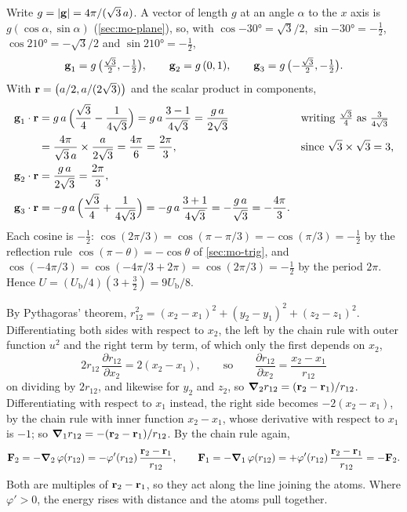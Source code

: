 Write $g = \lvert\bm{\mathrm{g}}\rvert = 4\pi/(\sqrt3\,a)$.
A vector of length $g$ at an angle $\alpha$ to the $x$ axis is $g(\cos
\alpha, \sin\alpha)$ (\cref{sec:mo-plane}), so, with $\cos\ang{-30} =
\sqrt3/2$, $\sin\ang{-30} = -\frac12$, $\cos\ang{210} = -\sqrt3/2$ and
$\sin\ang{210} = -\frac12$,
\begin{equation*}
   \bm{\mathrm{g}}_1 = g\,\bigl(\tfrac{\sqrt3}{2}, -\tfrac12\bigr) , \qquad
   \bm{\mathrm{g}}_2 = g\,(0, 1) , \qquad
   \bm{\mathrm{g}}_3 = g\,\bigl(-\tfrac{\sqrt3}{2}, -\tfrac12\bigr) .
\end{equation*}
With $\bm{\mathrm{r}} = \bigl(a/2, a/(2\sqrt3)\bigr)$ and the scalar product in
components,
\begin{align*}
   \bm{\mathrm{g}}_1\cdot\bm{\mathrm{r}}
   &= g\,a\,\Bigl(\frac{\sqrt3}{4} - \frac{1}{4\sqrt3}\Bigr)
   = g\,a\,\frac{3 - 1}{4\sqrt3} = \frac{g\,a}{2\sqrt3}
      && \text{writing $\tfrac{\sqrt3}{4}$ as $\tfrac{3}{4\sqrt3}$}\\
   &= \frac{4\pi}{\sqrt3\,a}\times\frac{a}{2\sqrt3} = \frac{4\pi}{6}
   = \frac{2\pi}{3} ,
      && \text{since $\sqrt3\times\sqrt3 = 3$,}\\
   \bm{\mathrm{g}}_2\cdot\bm{\mathrm{r}} &= \frac{g\,a}{2\sqrt3} = \frac{2\pi}{3} ,\\
   \bm{\mathrm{g}}_3\cdot\bm{\mathrm{r}}
   &= -g\,a\,\Bigl(\frac{\sqrt3}{4} + \frac{1}{4\sqrt3}\Bigr)
   = -g\,a\,\frac{3 + 1}{4\sqrt3} = -\frac{g\,a}{\sqrt3}
   = -\frac{4\pi}{3} .
\end{align*}
Each cosine is $-\frac12$: $\cos(2\pi/3) = \cos(\pi - \pi/3) =
-\cos(\pi/3) = -\frac12$ by the reflection rule $\cos(\pi - \theta) =
-\cos\theta$ of \cref{sec:mo-trig}, and $\cos(-4\pi/3) = \cos(-4\pi/3 +
2\pi) = \cos(2\pi/3) = -\frac12$ by the period $2\pi$. Hence $U =
(U_{\mathrm b}/4)(3 + \frac32) = 9U_{\mathrm b}/8$.

By Pythagoras' theorem, $r_{12}^2 = (x_2 - x_1)^2 +
(y_2 - y_1)^2 + (z_2 - z_1)^2$. Differentiating both sides with respect
to $x_2$, the left by the chain rule with outer function $u^2$ and the
right term by term, of which only the first depends on $x_2$,
\begin{equation*}
   2r_{12}\,\frac{\partial r_{12}}{\partial x_2} = 2(x_2 - x_1) ,
   \qquad\text{so}\qquad
   \frac{\partial r_{12}}{\partial x_2} = \frac{x_2 - x_1}{r_{12}}
\end{equation*}
on dividing by $2r_{12}$, and likewise for $y_2$ and $z_2$, so $\bm{\nabla}_2
r_{12} = (\bm{\mathrm{r}}_2 - \bm{\mathrm{r}}_1)/r_{12}$. Differentiating with respect to
$x_1$ instead, the right side becomes $-2(x_2 - x_1)$, by the chain rule
with inner function $x_2 - x_1$, whose derivative with respect to $x_1$
is $-1$; so $\bm{\nabla}_1 r_{12} = -(\bm{\mathrm{r}}_2 - \bm{\mathrm{r}}_1)/r_{12}$. By the chain rule again,
\begin{equation*}
   \bm{\mathrm{F}}_2 = -\bm{\nabla}_2\,\varphi(r_{12}) = -\varphi'(r_{12})\,
   \frac{\bm{\mathrm{r}}_2 - \bm{\mathrm{r}}_1}{r_{12}} ,
   \qquad
   \bm{\mathrm{F}}_1 = -\bm{\nabla}_1\,\varphi(r_{12}) = +\varphi'(r_{12})\,
   \frac{\bm{\mathrm{r}}_2 - \bm{\mathrm{r}}_1}{r_{12}} = -\bm{\mathrm{F}}_2 .
\end{equation*}
Both are multiples of $\bm{\mathrm{r}}_2 - \bm{\mathrm{r}}_1$, so they act along the line
joining the atoms. Where $\varphi' > 0$, the energy rises with distance
and the atoms pull together.

